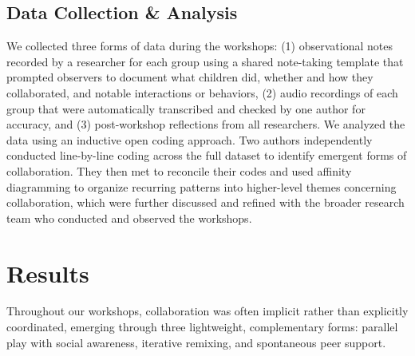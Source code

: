 \documentclass[sigconf,nonacm]{acmart}
\newcommand{\capybara}{\textsc{Capybara}\xspace}
\begin{document}

\subsection{Data Collection \& Analysis} 
We collected three forms of data during the workshops: (1) observational notes recorded by a researcher for each group using a shared note-taking template that prompted observers to document what children did, whether and how they collaborated, and notable interactions or behaviors, (2) audio recordings of each group that were automatically transcribed and checked by one author for accuracy, and (3) post-workshop reflections from all researchers. We analyzed the data using an inductive open coding approach. Two authors independently conducted line-by-line coding across the full dataset to identify emergent forms of collaboration. They then met to reconcile their codes and used affinity diagramming to organize recurring patterns into higher-level themes concerning collaboration, which were further discussed and refined with the broader research team who conducted and observed the workshops.

\section{Results}
Throughout our workshops, collaboration was often implicit rather than explicitly coordinated, emerging through three lightweight, complementary forms: parallel play with social awareness, iterative remixing, and spontaneous peer support.
\end{document}
